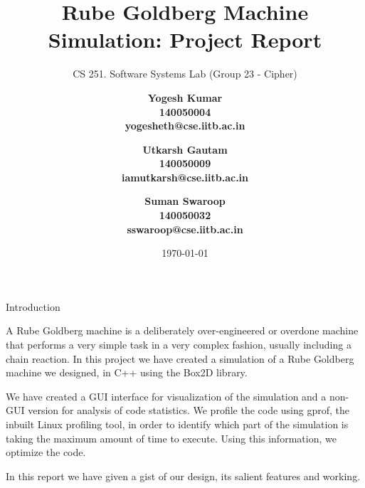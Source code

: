 \documentclass[a4paper,11pt]{resume}
\title{Rube Goldberg Machine Simulation: Project Report}
\subtitle{CS 251. Software Systems Lab (Group 23 - Cipher)}
\author{\bf{Yogesh Kumar}  \\
	140050004   \\
	yogesheth@cse.iitb.ac.in \\
	\and 
	\bf{Utkarsh Gautam} \\
	140050009  \\
	iamutkarsh@cse.iitb.ac.in \\
    \and 
    \bf{Suman Swaroop} \\
    140050032  \\
    sswaroop@cse.iitb.ac.in \\
    }
\date{\today}
\begin{document}
\maketitle

\begin{rSection}{{\heading Introduction}}
\begin{rSubsection}{}{}{}{}
\item A Rube Goldberg machine is a deliberately over-engineered or overdone machine that performs a very simple task in a very complex fashion, usually including a chain reaction. In this project we have created a simulation of a Rube Goldberg machine we designed, in C++ using the Box2D library.
\item We have created a GUI interface for visualization of the simulation and a non-GUI version for analysis of code statistics. We profile the code using gprof, the inbuilt Linux profiling tool, in order to identify which part of the simulation is taking the maximum amount of time to execute. Using this information, we optimize the code.
\item In this report we have given a gist of our design, its salient features and working. \\

\end{rSubsection}
\end{rSection}
\end{document}
